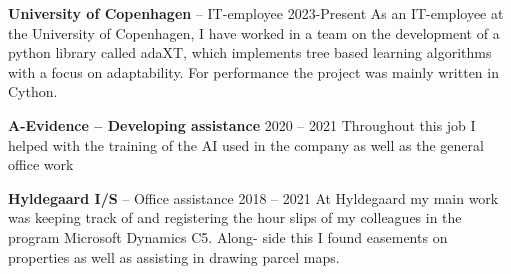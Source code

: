 \resumeSubHeadingListStart

  \resumeProjectHeading
  {\textbf{University of Copenhagen} -- IT-employee \vspace{8pt}}{2023-Present}
  \small{As an IT-employee at the University of Copenhagen,
  I have worked in a team on the development of a python library called adaXT,
  which implements tree based learning algorithms with a focus on adaptability.
  For performance the project was mainly written in Cython.
  }

  \resumeProjectHeading
  {\textbf{A-Evidence -- Developing assistance} \vspace{8pt}}{2020 -- 2021}
  \small{Throughout this job I helped with the training of the AI used in the
  company as well as the general office work}

  \resumeProjectHeading
  {\textbf{Hyldegaard I/S} -- Office assistance \vspace{8pt}}{2018 -- 2021}
  \small{At Hyldegaard my main work was keeping track of and registering the
  hour slips of my colleagues in the program Microsoft Dynamics C5. Along-
  side this I found easements on properties as well as assisting in drawing
  parcel maps.}

\resumeSubHeadingListEnd
